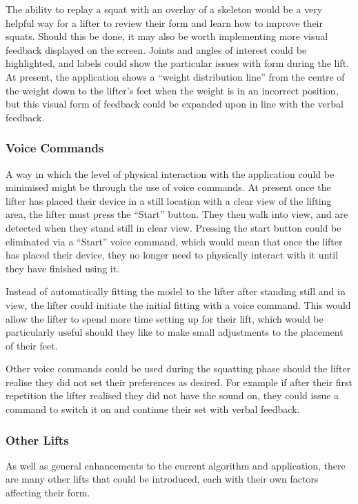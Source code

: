 The ability to replay a squat with an overlay of a skeleton would be a very helpful way for a lifter to review their form and learn how to improve their squats. Should this be done, it may also be worth implementing more visual feedback displayed on the screen. Joints and angles of interest could be highlighted, and labels could show the particular issues with form during the lift. At present, the application shows a ``weight distribution line'' from the centre of the weight down to the lifter's feet when the weight is in an incorrect position, but this visual form of feedback could be expanded upon in line with the verbal feedback.

\subsubsection{Voice Commands}

A way in which the level of physical interaction with the application could be minimised might be through the use of voice commands. At present once the lifter has placed their device in a still location with a clear view of the lifting area, the lifter must press the ``Start'' button. They then walk into view, and are detected when they stand still in clear view. Pressing the start button could be eliminated via a ``Start'' voice command, which would mean that once the lifter has placed their device, they no longer need to physically interact with it until they have finished using it.

Instead of automatically fitting the model to the lifter after standing still and in view, the lifter could initiate the initial fitting with a voice command. This would allow the lifter to spend more time setting up for their lift, which would be particularly useful should they like to make small adjustments to the placement of their feet.

Other voice commands could be used during the squatting phase should the lifter realise they did not set their preferences as desired. For example if after their first repetition the lifter realised they did not have the sound on, they could issue a command to switch it on and continue their set with verbal feedback.

\subsubsection{Other Lifts}

As well as general enhancements to the current algorithm and application, there are many other lifts that could be introduced, each with their own factors affecting their form.

